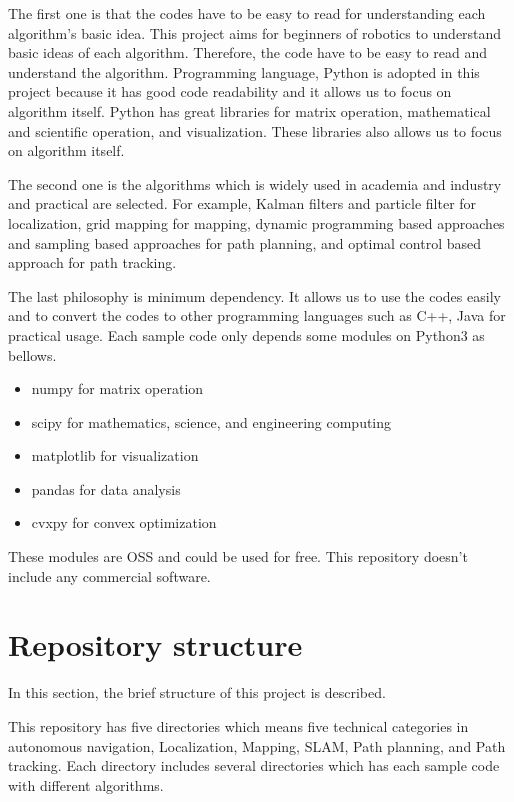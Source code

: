 \documentclass{bmvc2k}
\begin{document}
The first one is that the codes have to be easy to read for understanding each algorithm's basic idea.
This project aims for beginners of robotics to understand basic ideas of each algorithm. 
Therefore, the code have to be easy to read and understand the algorithm.
Programming language, Python\cite{python} is adopted in this project because it has good code readability and it allows us to focus on algorithm itself.
Python has great libraries for matrix operation, mathematical and scientific operation, and visualization.
These libraries also allows us to focus on algorithm itself.

The second one is the algorithms which is widely used in academia and industry and practical are selected.
For example, Kalman filters and particle filter for localization, grid mapping for mapping, dynamic programming based approaches and sampling based approaches for path planning, and optimal control based approach for path tracking.

The last philosophy is minimum dependency.
It allows us to use the codes easily and to convert the codes to other programming languages such as C++, Java for practical usage.
Each sample code only depends some modules on Python3 as bellows.

\begin{itemize}
 \item numpy\cite{numpy} for matrix operation
 \item scipy\cite{scipy} for mathematics, science, and engineering computing
 \item matplotlib\cite{matplotlib} for visualization
 \item pandas\cite{pandas} for data analysis
 \item cvxpy\cite{cvxpy} for convex optimization
\end{itemize}

These modules are OSS and could be used for free. This repository doesn't include any commercial software.


\section{Repository structure}

In this section, the brief structure of this project is described.

This repository has five directories which means five technical categories in autonomous navigation, Localization, Mapping, SLAM, Path planning, and Path tracking. Each directory includes several directories which has each sample code with different algorithms.
\end{document}
